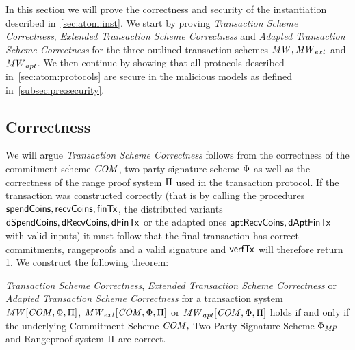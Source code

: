 In this section we will prove the correctness and security of the instantiation described in~\ref{sec:atom:inst}.
We start by proving \emph{Transaction Scheme Correctness}, \emph{Extended Transaction Scheme Correctness} and \emph{Adapted Transaction Scheme Correctness} for the three outlined transaction schemes $\mathit{MW}, \mathit{MW}_{ext}$ and $\mathit{MW}_{apt}$.
We then continue by showing that all protocols described in~\ref{sec:atom:protocols} are secure in the malicious models as defined in~\ref{subsec:pre:security}.

\subsection{Correctness} \label{subsec:atom:correctness}

We will argue \emph{Transaction Scheme Correctness} follows from the correctness of the commitment scheme $\mathit{COM}$, two-party signature scheme $\Phi$ as well as the correctness of the range proof system $\Pi$ used in the transaction protocol.
If the transaction was constructed correctly (that is by calling the procedures $\mathsf{spendCoins}, \mathsf{recvCoins}, \mathsf{finTx}$, the distributed variants $\mathsf{dSpendCoins}, \mathsf{dRecvCoins}, \mathsf{dFinTx}$ or the adapted ones $\mathsf{aptRecvCoins}, \mathsf{dAptFinTx}$ with valid inputs) it must follow that the final transaction has correct commitments, rangeproofs and a valid signature and $\mathsf{verfTx}$ will therefore return 1.
We construct the following theorem:

\begin{theorem}
    \label{lem:atom:correctness}
    \emph{Transaction Scheme Correctness}, \emph{Extended Transaction Scheme Correctness} or \emph{Adapted Transaction Scheme Correctness} for a transaction system $\mathit{MW}[\mathit{COM},\Phi,\Pi]$, $\mathit{MW}_{ext}[\mathit{COM},\Phi,\Pi]$ or $\mathit{MW}_{apt}[\mathit{COM},\Phi,\Pi]$ holds if and only if the underlying Commitment Scheme $\mathit{COM},$ Two-Party Signature Scheme $\Phi_{\mathit{MP}}$ and Rangeproof system $\Pi$ are correct.
\end{theorem}


